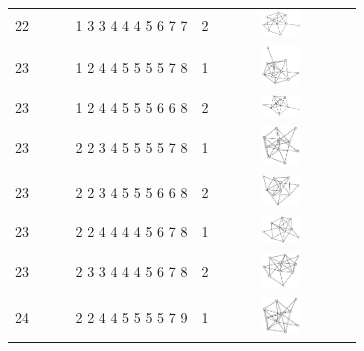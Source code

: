 \begin{table}[h!]
\begin{tabular}{m{0.12\linewidth} m{0.25\linewidth} m{0.12\linewidth} m{0.2\linewidth}}
22 & 1 3 3 4 4 4 5 6 7 7 & 2 & \includegraphics[width=1cm]{15-universal-graphs/img/degree-sequences-example-graphs/graph-5-10-7} \\
23 & 1 2 4 4 5 5 5 5 7 8 & 1 & \includegraphics[width=1cm]{15-universal-graphs/img/degree-sequences-example-graphs/graph-5-10-8} \\
23 & 1 2 4 4 5 5 5 6 6 8 & 2 & \includegraphics[width=1cm]{15-universal-graphs/img/degree-sequences-example-graphs/graph-5-10-9} \\
23 & 2 2 3 4 5 5 5 5 7 8 & 1 & \includegraphics[width=1cm]{15-universal-graphs/img/degree-sequences-example-graphs/graph-5-10-10} \\
23 & 2 2 3 4 5 5 5 6 6 8 & 2 & \includegraphics[width=1cm]{15-universal-graphs/img/degree-sequences-example-graphs/graph-5-10-11} \\
23 & 2 2 4 4 4 4 5 6 7 8 & 1 & \includegraphics[width=1cm]{15-universal-graphs/img/degree-sequences-example-graphs/graph-5-10-12} \\
23 & 2 3 3 4 4 4 5 6 7 8 & 2 & \includegraphics[width=1cm]{15-universal-graphs/img/degree-sequences-example-graphs/graph-5-10-13} \\
24 & 2 2 4 4 5 5 5 5 7 9 & 1 & \includegraphics[width=1cm]{15-universal-graphs/img/degree-sequences-example-graphs/graph-5-10-14} \\

\end{tabular}
\end{table}
